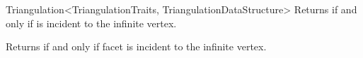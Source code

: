 \begin{ccRefClass}{Triangulation<TriangulationTraits, TriangulationDataStructure>}
{Returns  if and only if  is incident to the infinite vertex.
}

\ccGlue

{Returns  if and only if facet  is incident to the infinite
vertex. 
}

\ccGlue












\end{ccRefClass}
